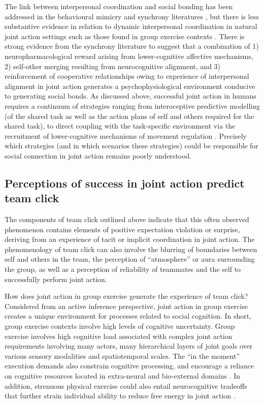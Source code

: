 \begin{CJK}{UTF8}{gbsn}
The link between interpersonal coordination and social bonding has been addressed in the behavioural mimicry and synchrony literatures \citep[e.g.,][]{Wheatley2012,Launay2016,Mogan2017}, but there is less substantive evidence in relation to dynamic interpersonal coordination in natural joint action settings such as those found in group exercise contexts \citep{Marsh2009,Miles2009,Lumsden2012}.  There is strong evidence from the synchrony literature to suggest that a combination of 1) neuropharmacological reward arising from lower-cognitive affective mechanisms, 2) self-other merging resulting from neurocognitive alignment, and 3) reinforcement of cooperative relationships owing to experience of interpersonal alignment in joint action generates a psychophysiological environment conducive to generating social bonds.  As discussed above, successful joint action in humans requires a continuum of strategies ranging from interoceptive predictive modelling (of the shared task as well as the action plans of self and others required for the shared task), to direct coupling with the task-specific environment via the recruitment of lower-cognitive mechanisms of movement regulation \citep[e.g., proprioceptive mechanisms of balance and orientation][]{Semin2008} .  Precisely which strategies (and in which scenarios these strategies) could be responsible for social connection in joint action remains poorly understood.

\subsection{Perceptions of success in joint action predict team click}

The components of team click outlined above indicate that this often observed phenomenon contains elements of positive expectation violation or surprise, deriving from an experience of tacit or implicit coordination in joint action.  The phenomenology of team click can also involve the blurring of boundaries between self and others in the team, the perception of ``atmosphere'' or aura surrounding the group, as well as a perception of reliability of teammates and the self to successfully perform joint action.

How does joint action in group exercise generate the experience of team click?  Considered from an active inference perspective, joint action in group exercise creates a unique environment for processes related to social cognition. In short, group exercise contexts involve high levels of cognitive uncertainty.  Group exercise involves high cognitive load associated with complex joint action requirements involving many actors, many hierarchical layers of joint goals over various sensory modalities and spatiotemporal scales. The ``in the moment'' execution demands also constrain cognitive processing, and encourage a reliance on cognitive resources located in extra-neural and bio-external domains \citep{Bourbousson2016}.  In addition, strenuous physical exercise could also entail neurocognitive tradeoffs that further strain individual ability to reduce free energy in joint action \citep{Dietrich2004b}.


\end{CJK}

